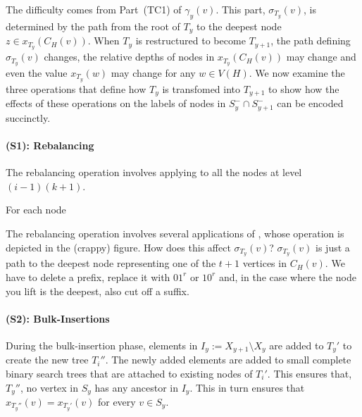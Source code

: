 \documentclass[kpfonts]{patmorin}
\begin{document}
The difficulty comes from Part~(TC1) of $\gamma_y(v)$.  This part, $\sigma_{T_y}(v)$, is determined by the path from the root of $T_y$ to the deepest node $z\in x_{T_y}(C_H(v))$.  When $T_y$ is restructured to become $T_{y+1}$, the path defining $\sigma_{T_y}(v)$ changes, the relative depths of nodes in $x_{T_y}(C_H(v))$ may change and even the value $x_{T_y}(w)$ may change for any $w\in V(H)$.  We now examine the three operations that define how $T_y$ is transfomed into $T_{y+1}$ to show how the effects of these operations on the labels of nodes in $S^-_y\cap S^-_{y+1}$ can be encoded succinctly.
% 
% 

\paragraph{(S1): Rebalancing}

The rebalancing operation involves applying  to all the nodes at level $(i-1)(k+1)$.



For each node 


The rebalancing operation involves several applications of , whose operation is depicted in the (crappy) figure. How does this affect $\sigma_{T_y}(v)$?  $\sigma_{T_y}(v)$ is just a path to the deepest node representing one of the $t+1$ vertices in $C_H(v)$.  We have to delete a prefix, replace it with $01^r$ or $10^r$ and, in the case where the node you lift is the deepest, also cut off a suffix.





\paragraph{(S2): Bulk-Insertions}

During the bulk-insertion phase, elements in $I_y:=X_{y+1}\setminus X_y$ are added to $T_y'$ to create the new tree $T_{i}''$.  The newly added elements are added to small complete binary search trees that are attached to existing nodes of $T_{i}'$.  This ensures that, $T_y''$, no vertex in $S_y$ has any ancestor in $I_y$.  This in turn ensures that $x_{T_y''}(v)=x_{T_y'}(v)$ for every $v\in S_y$.
\end{document}

